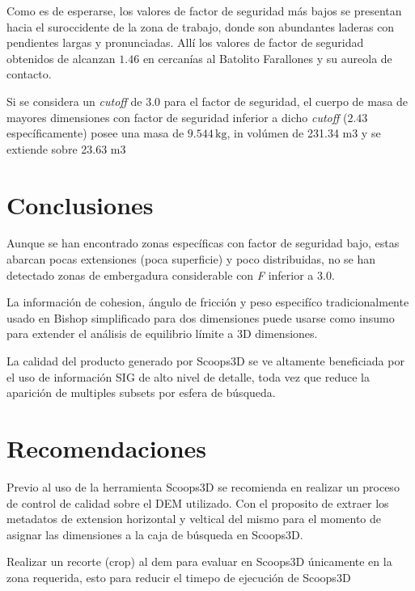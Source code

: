 Como es de esperarse, los valores de factor de seguridad m\'as bajos se presentan hacia el suroccidente de la zona de trabajo, donde  son abundantes laderas con pendientes  largas y pronunciadas. All\'i los valores de factor de seguridad obtenidos de alcanzan \(1.46\) en cercan\'ias al Batolito Farallones y su aureola de contacto. 

Si se considera un \textit{cutoff} de 3.0 para el factor de seguridad, el cuerpo de masa de mayores dimensiones con factor de seguridad  inferior a dicho \textit{cutoff} ($2.43$ espec\'ificamente) posee una masa de $9.544\,\text{kg}$, in vol\'umen de 231.34 m3 y se extiende sobre 23.63 m3



\section{Conclusiones}


Aunque se han encontrado zonas espec\'ificas con factor de seguridad bajo, estas abarcan pocas extensiones (poca superficie) y poco distribuidas, no se han detectado zonas de embergadura considerable con \textit{F} inferior a 3.0.

La informaci\'on de cohesion, \'angulo de fricci\'on y peso especif\'ico tradicionalmente usado en Bishop simplificado para dos dimensiones puede usarse como insumo para extender el an\'alisis  de equilibrio l\'imite a 3D dimensiones.

La calidad del producto generado por Scoops3D se ve altamente beneficiada por el uso de informaci\'on SIG de alto nivel de detalle, toda vez que reduce la aparici\'on de multiples subsets por esfera de b\'usqueda. 





\section{Recomendaciones}

Previo al uso de la herramienta Scoops3D se recomienda en realizar un proceso de control de calidad sobre el DEM utilizado. Con el proposito de extraer los metadatos de extension horizontal y veltical del mismo para el momento de asignar las dimensiones a la caja de b\'usqueda en Scoops3D.

Realizar un recorte (crop) al dem para evaluar en Scoops3D \'unicamente en la zona requerida, esto para reducir el timepo de ejecuci\'on de Scoops3D

